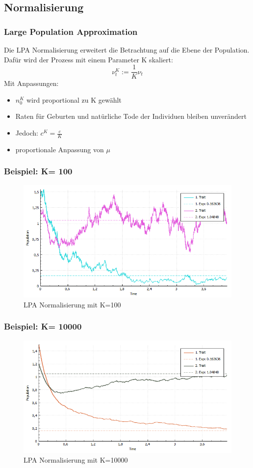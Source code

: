 \documentclass{beamer}
\begin{document}
	\subsection{Normalisierung}
		\begin{frame}
			\frametitle{Large Population Approximation}
			Die LPA Normalisierung erweitert die Betrachtung auf die Ebene der Population. 
			\pause
			Dafür wird der Prozess mit einem Parameter K skaliert:
			\[ \nu_t^K := \frac{1}{K} \nu_t \]
			\pause
			Mit Anpassungen:
			\begin{itemize}
				\item $ n_0^K $ wird proportional zu K gewählt
				\pause
				\item Raten für Geburten und natürliche Tode der Individuen bleiben unverändert
				\pause
				\item Jedoch: $ c^K = \frac{c}{K} $
				\pause
				\item proportionale Anpassung von $ \mu $
			\end{itemize}
		\end{frame}
		\begin{frame}
			\frametitle{Beispiel: K= 100}
			\begin{figure}[H]
				\centering
				\includegraphics[width=1\linewidth]{./LPANormalisierungK100}
				\caption[LPAK100]{LPA Normalisierung mit K=100}
				\label{LPA Normalisierung K=100}
			\end{figure}
		\end{frame}
		\begin{frame}
			\frametitle{Beispiel: K= 10000}
			\begin{figure}[H]
				\centering
				\includegraphics[width=1\linewidth]{./LPANormalisierungK10000}
				\caption[LPAK100]{LPA Normalisierung mit K=10000}
				\label{LPA Normalisierung K=10000}
			\end{figure}
		\end{frame}
		
\end{document}
